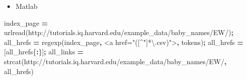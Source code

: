 \documentclass[
]{book}
\newenvironment{Shaded}{\begin{snugshade}}{\end{snugshade}}
\newcommand{\NormalTok}[1]{#1}
\newcommand{\OperatorTok}[1]{\textcolor[rgb]{0.81,0.36,0.00}{\textbf{#1}}}
\newcommand{\SpecialStringTok}[1]{\textcolor[rgb]{0.31,0.60,0.02}{#1}}
\newcommand{\VariableTok}[1]{\textcolor[rgb]{0.00,0.00,0.00}{#1}}
\providecommand{\tightlist}{%
  \setlength{\itemsep}{0pt}\setlength{\parskip}{0pt}}
\begin{document}
\begin{itemize}
\tightlist
\item
  Matlab
\end{itemize}

\begin{Shaded}
\begin{Highlighting}[]
\VariableTok{index\_page} \OperatorTok{=} \VariableTok{urlread}\NormalTok{(}\SpecialStringTok{\textquotesingle{}http://tutorials.iq.harvard.edu/example\_data/baby\_names/EW/\textquotesingle{}}\NormalTok{)}\OperatorTok{;}
\VariableTok{all\_hrefs} \OperatorTok{=} \VariableTok{regexp}\NormalTok{(}\VariableTok{index\_page}\OperatorTok{,} \SpecialStringTok{\textquotesingle{}\textless{}a href="([\^{}"]*\textbackslash{}.csv)"\textgreater{}\textquotesingle{}}\OperatorTok{,} \SpecialStringTok{\textquotesingle{}tokens\textquotesingle{}}\NormalTok{)}\OperatorTok{\textquotesingle{};}
\VariableTok{all\_hrefs} \OperatorTok{=}\NormalTok{ [}\VariableTok{all\_hrefs}\NormalTok{\{}\OperatorTok{:}\NormalTok{\}]}\OperatorTok{\textquotesingle{};}
\VariableTok{all\_links} \OperatorTok{=} \VariableTok{strcat}\NormalTok{(}\SpecialStringTok{\textquotesingle{}http://tutorials.iq.harvard.edu/example\_data/baby\_names/EW/\textquotesingle{}}\OperatorTok{,} \VariableTok{all\_hrefs}\NormalTok{)}
\end{Highlighting}
\end{Shaded}
\end{document}
